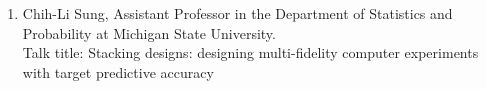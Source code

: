 \documentclass[12pt,a4paper,figuresright]{book}
\begin{document}
\begin{enumerate}
\item Chih-Li Sung, Assistant Professor in the Department of Statistics and Probability at Michigan State University.\\
Talk title: Stacking designs: designing multi-fidelity computer experiments with target predictive accuracy


\end{enumerate}
\end{document}
